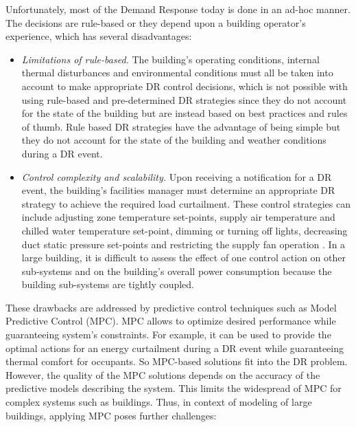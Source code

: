 Unfortunately, most of the Demand Response today is done in an ad-hoc manner. 
The decisions are rule-based or they depend upon a building operator's experience, which has several disadvantages:

\begin{itemize}[leftmargin=1cm]
	\item \emph{Limitations of rule-based.} The building's operating conditions, internal thermal disturbances and environmental conditions must all be taken into account to make appropriate DR control decisions, which is not possible with using rule-based and pre-determined DR strategies since they do not account for the state of the building but are instead based on best practices and rules of thumb. 
	Rule based DR strategies have the advantage of being simple but they do not account for the state of the building and weather conditions during a DR event.
	\item \emph{Control complexity and scalability.} Upon receiving a notification for a DR event, the building's facilities manager must determine an appropriate DR strategy to achieve the required load curtailment. 
	These control strategies can include adjusting zone temperature set-points, supply air temperature and chilled water temperature set-point, dimming or turning off lights, decreasing duct static pressure set-points and restricting the supply fan operation \etc. 
	In a large building, it is difficult to assess the effect of one control action on other sub-systems and on the building's overall power consumption because the building sub-systems are tightly coupled.
\end{itemize}
These drawbacks are addressed by predictive control techniques such as Model Predictive Control (MPC). MPC allows to optimize desired performance while guaranteeing system's constraints. For example, it can be used to provide the optimal actions for an energy curtailment during a DR event while guaranteeing thermal comfort for occupants. So MPC-based solutions fit into the DR problem. However, the quality of the MPC solutions depends on the accuracy of the predictive models describing the system. This limits the widespread of MPC for complex systems such as buildings. Thus, in context of modeling of large buildings, applying MPC poses further challenges:

